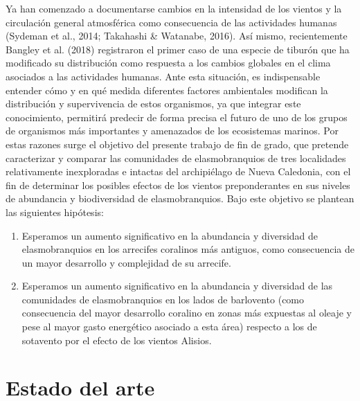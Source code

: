\documentclass[a4paper, 11pt]{article}
\begin{document}
Ya han comenzado a documentarse cambios en la intensidad de los vientos y la circulación general atmosférica como consecuencia de las actividades humanas (Sydeman et al., 2014; Takahashi & Watanabe, 2016). Así mismo, recientemente Bangley et al. (2018) registraron el primer caso de una especie de tiburón que ha modificado su distribución como respuesta a los cambios globales en el clima asociados a las actividades humanas. Ante esta situación, es indispensable entender cómo y en qué medida diferentes factores ambientales modifican la distribución y supervivencia de estos organismos, ya que integrar este conocimiento, permitirá predecir de forma precisa el futuro de uno de los grupos de organismos más importantes y amenazados de los ecosistemas marinos. Por estas razones surge el objetivo del presente trabajo de fin de grado, que pretende caracterizar y comparar las comunidades de elasmobranquios de tres localidades relativamente inexploradas e intactas del archipiélago de Nueva Caledonia, con el fin de determinar los posibles efectos de los vientos preponderantes en sus niveles de abundancia y biodiversidad de elasmobranquios. Bajo este objetivo se plantean las siguientes hipótesis:
\begin{enumerate}
\item Esperamos un aumento significativo en la abundancia y diversidad de elasmobranquios en los arrecifes coralinos más antiguos, como consecuencia de un mayor desarrollo y complejidad de su arrecife.
\item Esperamos un aumento significativo en la abundancia y diversidad de las comunidades de elasmobranquios en los lados de barlovento (como consecuencia del mayor desarrollo coralino en zonas más expuestas al oleaje y pese al mayor gasto energético asociado a esta área) respecto a los de sotavento por el efecto de los vientos Alisios.
\end{enumerate}

\section{Estado del arte}
\end{document}
